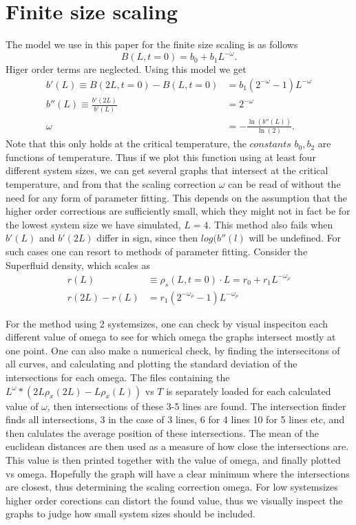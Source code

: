 \documentclass[a4paper]{article}
\begin{document}
\section{Finite size scaling}
The model we use in this paper for the finite size scaling is as follows
\begin{equation}
  B(L,t=0) = b_0 + b_1L^{-\omega}.
\end{equation}
Higer order terms are neglected.
Using this model we get
\begin{align}
  b'(L) \equiv B(2L,t=0) - B(L,t=0) &= b_1(2^{-\omega} -1)L^{-\omega}\\
  b''(L)\equiv \frac{b'(2L)}{b'(L)} &= 2^{-\omega}\\
  \omega &= -\frac{\ln(b''(L))}{\ln(2)}.
\end{align}
Note that this only holds at the critical temperature, the $\textit{constants}$ $b_0, b_2$ are functions of temperature. Thus if we plot this function using at least four different system sizes, we can get several graphs that intersect at the critical temperature, and from that the scaling correction $\omega$ can be read of without the need for any form of parameter fitting. This depends on the assumption that the higher order corrections are sufficiently small, which they might not in fact be for the lowest system size we have simulated, $L=4$. This method also fails when $b'(L)$ and $b'(2L)$ differ in sign, since then $log(b''(l)$ will be undefined.
For such cases one can resort to methods of parameter fitting.
Consider the Superfluid density, which scales as 
\begin{align}
  r(L)&\equiv \rho_s(L,t=0) \cdot L = r_0 + r_1L^{-\omega_\rho}\\
  r(2L) - r(L) &= r_1(2^{-\omega_\rho} -1)L^{-\omega_\rho}
\end{align}


For the method using 2 systemsizes, one can check by visual inspeciton each different value of omega to see for which omega the graphs intersect mostly at one point. One can also make a numerical check, by finding the intersecitons of all curves, and calculating  and plotting the standard deviation of the intersections for each omega.
The files containing the $L^{\omega}*(2L\rho_x(2L) - L\rho_x(L))$ vs $T$ is separately loaded for each calculated value of $\omega$, then intersections of these 3-5 lines are found. 
The intersection finder finds all intersections, 3 in the case of 3 lines, 6 for 4 lines 10 for 5 lines etc, and then calulates the average position of these intersections. The mean of the euclidean distances are then used as a measure of how close the intersections are. This value is then printed together with the value of omega, and finally plotted vs omega.
Hopefully the graph will have a clear minimum where the intersections are closest, thus determining the scaling correction omega. For low systemsizes higher order corections can distort the found value, thus we visually inspect the graphs to judge how small system sizes should be included. 
\end{document}
